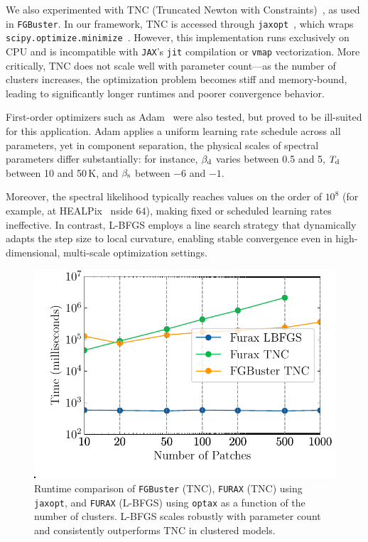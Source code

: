 \documentclass[fleqn,usenatbib]{mnras}
\begin{document}
We also experimented with TNC (Truncated Newton with Constraints)~\citep{TNC}, as used in \texttt{FGBuster}. In our framework, TNC is accessed through \texttt{jaxopt}~\citep{jaxopt}, which wraps \texttt{scipy.optimize.minimize}~\citep{scipy}. However, this implementation runs exclusively on CPU and is incompatible with \texttt{JAX}’s \texttt{jit} compilation or \texttt{vmap} vectorization. More critically, TNC does not scale well with parameter count---as the number of clusters increases, the optimization problem becomes stiff and memory-bound, leading to significantly longer runtimes and poorer convergence behavior.

First-order optimizers such as Adam~\citep{adam} were also tested, but proved to be ill-suited for this application. Adam applies a uniform learning rate schedule across all parameters, yet in component separation, the physical scales of spectral parameters differ substantially: for instance, \( \beta_{\rm d} \) varies between 0.5 and 5, \( T_{\rm d} \) between 10 and 50\,\(\mathrm{K}\), and \( \beta_{\rm s} \) between \(-6\) and \(-1\).

Moreover, the spectral likelihood typically reaches values on the order of \( 10^8 \) (for example, at HEALPix~\citep{Gorski2005} nside \( 64 \)), making fixed or scheduled learning rates ineffective. In contrast, L-BFGS employs a line search strategy that dynamically adapts the step size to local curvature, enabling stable convergence even in high-dimensional, multi-scale optimization settings.

\begin{figure}
\centering
\includegraphics[width=1\columnwidth]{figures/runtime_comparison.pdf}
\caption{Runtime comparison of \texttt{FGBuster} (TNC), \texttt{FURAX} (TNC) using \texttt{jaxopt}, and \texttt{FURAX} (L-BFGS) using \texttt{optax} as a function of the number of clusters. L-BFGS scales robustly with parameter count and consistently outperforms TNC in clustered models. }
\label{fig:runtime_comparison}
\end{figure}
\end{document}
